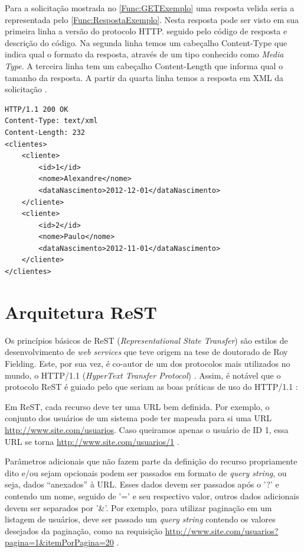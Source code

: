 Para a solicitação mostrada no \autoref{Func:GETExemplo} uma resposta velida seria a representada pelo \autoref{Func:RespostaExemplo}.
Nesta resposta pode ser visto em sua primeira linha a versão do protocolo HTTP. seguido pelo código de resposta e descrição do código.
Na segunda linha temos um cabeçalho Content-Type que indica qual o formato da resposta, através de um tipo conhecido como \textit{Media Type}.
A terceira linha tem um cabeçalho Content-Length que informa qual o tamanho da resposta.
A partir da quarta linha temos a resposta em XML da solicitação \cite{Saudate:2014}.



\begin{lstlisting}[label=Func:RespostaExemplo,caption={[Exemplo de uma resposta HTTP com status 200.]Exemplo de uma resposta HTTP com status 200, possuindo um Content-Type:text/xml informando que a resposta é em formato XML, e a resposta a solicitação.}]
HTTP/1.1 200 OK
Content-Type: text/xml
Content-Length: 232
<clientes>
	<cliente>
		<id>1</id>
		<nome>Alexandre</nome>
		<dataNascimento>2012-12-01</dataNascimento>
	</cliente>
	<cliente>
		<id>2</id>
		<nome>Paulo</nome>
		<dataNascimento>2012-11-01</dataNascimento>
	</cliente>
</clientes>
\end{lstlisting}


\section{Arquitetura ReST} \label{sec:ArquiteturaReST}

Os princípios básicos de ReST (\textit{Representational State Transfer}) são estilos de desenvolvimento
de \textit{web services} que teve origem na tese de doutorado de Roy Fielding. 
Este, por sua vez, é co-autor de um dos protocolos mais utilizados no mundo, o HTTP/1.1 (\textit{HyperText Transfer Protocol}) \cite{Boagrio:2017,Saudate:2014}.  
Assim, é notável que o protocolo ReST é guiado pelo que seriam as boas práticas de uso do HTTP/1.1 \cite{Saudate:2014}:


Em ReST, cada recurso deve ter uma URL bem definida. Por exemplo, o conjunto dos usuários de um sistema pode ter mapeada para si uma URL \url{http://www.site.com/usuarios}. Caso queiramos apenas o usuário de ID 1, essa URL se torna \url{http://www.site.com/usuarios/1} \cite{Saudate:2012}.

Parâmetros adicionais que não fazem parte da definição do recurso propriamente dito e/ou sejam opcionais podem ser passados em formato de \textit{query string}, ou seja, dados “anexados” à URL. 
Esses dados devem ser passados após o '?' e contendo um nome, seguido de '=' e seu respectivo valor, outros dados adicionais devem ser separados por '\&'. 
Por exemplo, para utilizar paginação em um listagem de usuários, deve ser passado um \textit{query string} contendo os valores desejados da paginação, como na requisição \url{http://www.site.com/usuarios?pagina=1\&itemPorPagina=20} \cite{Saudate:2012}.

